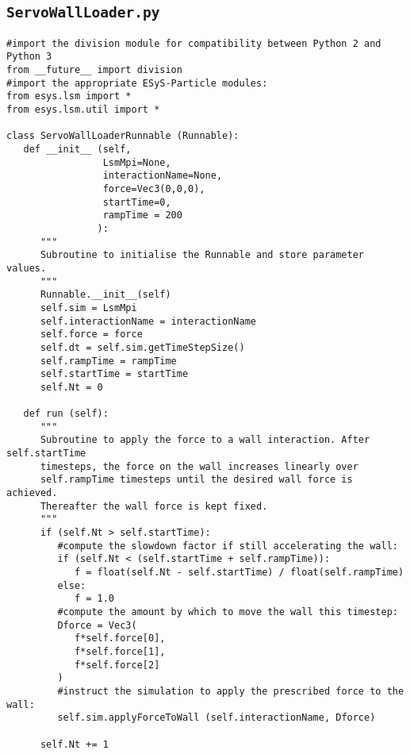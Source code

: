 \subsection{\texttt{ServoWallLoader.py}}\label{code:ServoWallLoader}

\begin{verbatim}
#import the division module for compatibility between Python 2 and Python 3
from __future__ import division
#import the appropriate ESyS-Particle modules:
from esys.lsm import *
from esys.lsm.util import *

class ServoWallLoaderRunnable (Runnable):
   def __init__ (self,
                 LsmMpi=None,
                 interactionName=None,
                 force=Vec3(0,0,0),
                 startTime=0,
                 rampTime = 200
                ):
      """
      Subroutine to initialise the Runnable and store parameter values.
      """
      Runnable.__init__(self)
      self.sim = LsmMpi
      self.interactionName = interactionName
      self.force = force
      self.dt = self.sim.getTimeStepSize()
      self.rampTime = rampTime
      self.startTime = startTime
      self.Nt = 0

   def run (self):
      """
      Subroutine to apply the force to a wall interaction. After self.startTime
      timesteps, the force on the wall increases linearly over
      self.rampTime timesteps until the desired wall force is achieved.
      Thereafter the wall force is kept fixed.
      """
      if (self.Nt > self.startTime):
         #compute the slowdown factor if still accelerating the wall:
         if (self.Nt < (self.startTime + self.rampTime)):
            f = float(self.Nt - self.startTime) / float(self.rampTime)
         else:
            f = 1.0
         #compute the amount by which to move the wall this timestep:
         Dforce = Vec3(
            f*self.force[0],
            f*self.force[1],
            f*self.force[2]
         )
         #instruct the simulation to apply the prescribed force to the wall:
         self.sim.applyForceToWall (self.interactionName, Dforce)

      self.Nt += 1

\end{verbatim}

